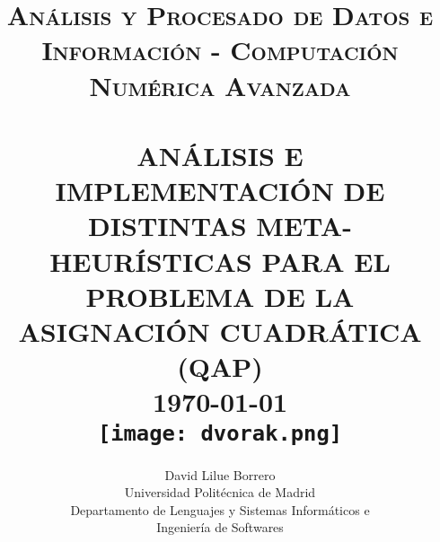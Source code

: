 

\pagestyle{fancy}
\fancyhf{}
\setlength\headheight{15pt}
\fancyfoot[C]{\thepage}

\usepackage[ddmmyyyy]{datetime}



\title{ \normalsize \textsc{Análisis y Procesado de Datos e Información - Computación Numérica Avanzada}
        \\ [2.0cm]
        \HRule{0.5pt} \\
        \LARGE \textbf{\uppercase{Análisis e implementación de distintas meta-heurísticas para el problema de la asignación cuadrática (QAP)}}
        \HRule{2pt} \\ [0.5cm]
        \normalsize \mydate\today \vspace*{3\baselineskip}\\
        \texttt{[image: dvorak.png]}\vfill}

\date{}

\author{
        David Lilue Borrero \\
        Universidad Politécnica de Madrid \\
        Departamento de Lenguajes y Sistemas Informáticos e\\ Ingeniería de Softwares }

\maketitle
\tableofcontents
\thispagestyle{empty}
\newpage

\sectionfont{\scshape}

